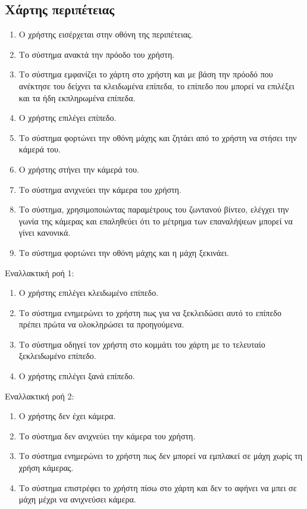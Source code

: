 \newpage
\subsection{Χάρτης περιπέτειας}
\label{sec:map}
\begin{enumerate}
    \item Ο χρήστης εισέρχεται στην οθόνη της περιπέτειας.
    \item Το σύστημα ανακτά την πρόοδο του χρήστη.
    \item Το σύστημα εμφανίζει το χάρτη στο χρήστη και με βάση την πρόοδό που ανέκτησε του δείχνει τα κλειδωμένα επίπεδα, το επίπεδο που μπορεί να επιλέξει και τα ήδη εκπληρωμένα επίπεδα. 
    \item Ο χρήστης επιλέγει επίπεδο.
    \item Το σύστημα φορτώνει την οθόνη μάχης και ζητάει από το χρήστη να στήσει την κάμερά του.
    \item Ο χρήστης στήνει την κάμερά του.
    \item Το σύστημα ανιχνεύει την κάμερα του χρήστη. 
    \item Το σύστημα, χρησιμοποιώντας παραμέτρους του ζωντανού βίντεο, ελέγχει την γωνία της κάμερας και επαληθεύει ότι το μέτρημα των επαναλήψεων μπορεί να γίνει κανονικά.
    \item Το σύστημα φορτώνει την οθόνη μάχης και η μάχη ξεκινάει.
\end{enumerate}


Εναλλακτική ροή 1: 
\begin{enumerate}[label=4.\alph*.,ref=4.\alph*]
\item Ο χρήστης επιλέγει κλειδωμένο επίπεδο.
\item Το σύστημα ενημερώνει το χρήστη πως για να ξεκλειδώσει αυτό το επίπεδο πρέπει πρώτα να ολοκληρώσει τα προηγούμενα.
\item Το σύστημα οδηγεί τον χρήστη στο κομμάτι του χάρτη με το τελευταίο ξεκλειδωμένο επίπεδο.
\item Ο χρήστης επιλέγει ξανά επίπεδο.
\end{enumerate}


Εναλλακτική ροή 2:
\begin{enumerate}[label=6.\alph*.,ref=6.\alph*]
\item Ο χρήστης δεν έχει κάμερα.
\item Το σύστημα δεν ανιχνεύει την κάμερα του χρήστη.
\item Το σύστημα ενημερώνει το χρήστη πως δεν μπορεί να εμπλακεί σε μάχη χωρίς τη χρήση κάμερας.
\item Το σύστημα επιστρέφει το χρήστη πίσω στο χάρτη και δεν το αφήνει να μπει σε μάχη μέχρι να ανιχνεύσει κάμερα.
\end{enumerate}

